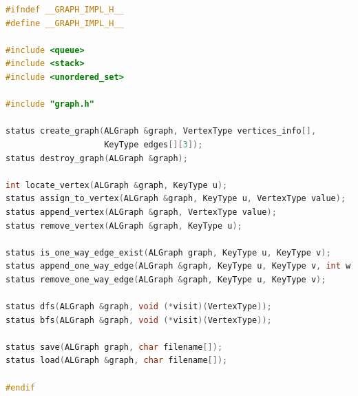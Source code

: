 \documentclass[supercite]{Experimental_Report}
\theoremstyle{definition}
\begin{document}
\begin{lstlisting}[caption={$graph\_impl.h$}, language=C++, frame=single]
#ifndef __GRAPH_IMPL_H__
#define __GRAPH_IMPL_H__

#include <queue>
#include <stack>
#include <unordered_set>

#include "graph.h"

status create_graph(ALGraph &graph, VertexType vertices_info[],
					KeyType edges[][3]);
status destroy_graph(ALGraph &graph);

int locate_vertex(ALGraph &graph, KeyType u);
status assign_to_vertex(ALGraph &graph, KeyType u, VertexType value);
status append_vertex(ALGraph &graph, VertexType value);
status remove_vertex(ALGraph &graph, KeyType u);

status is_one_way_edge_exist(ALGraph graph, KeyType u, KeyType v);
status append_one_way_edge(ALGraph &graph, KeyType u, KeyType v, int w);
status remove_one_way_edge(ALGraph &graph, KeyType u, KeyType v);

status dfs(ALGraph &graph, void (*visit)(VertexType));
status bfs(ALGraph &graph, void (*visit)(VertexType));

status save(ALGraph graph, char filename[]);
status load(ALGraph &graph, char filename[]);

#endif	
\end{lstlisting}
\end{document}
